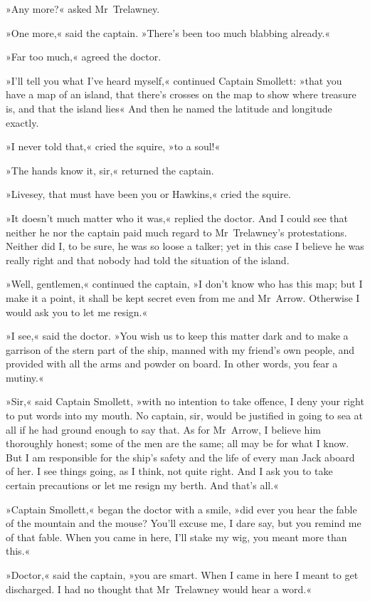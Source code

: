 »Any more?« asked Mr~Trelawney.

»One more,« said the captain. »There's been too much blabbing already.«

»Far too much,« agreed the doctor.

»I'll tell you what I've heard myself,« continued Captain Smollett: »that you have a map of an island, that there's crosses on the map to show where treasure is, and that the island lies\longdash« And then he named the latitude and longitude exactly.

»I never told that,« cried the squire, »to a soul!«

»The hands know it, sir,« returned the captain.

»Livesey, that must have been you or Hawkins,« cried the squire.

»It doesn't much matter who it was,« replied the doctor. And I could see that neither he nor the captain paid much regard to Mr~Trelawney's protestations. Neither did I, to be sure, he was so loose a talker; yet in this case I believe he was really right and that nobody had told the situation of the island.

»Well, gentlemen,« continued the captain, »I don't know who has this map; but I make it a point, it shall be kept secret even from me and Mr~Arrow. Otherwise I would ask you to let me resign.«

»I see,« said the doctor. »You wish us to keep this matter dark and to make a garrison of the stern part of the ship, manned with my friend's own people, and provided with all the arms and powder on board. In other words, you fear a mutiny.«

»Sir,« said Captain Smollett, »with no intention to take offence, I deny your right to put words into my mouth. No captain, sir, would be justified in going to sea at all if he had ground enough to say that. As for Mr~Arrow, I believe him thoroughly honest; some of the men are the same; all may be for what I know. But I am responsible for the ship's safety and the life of every man Jack aboard of her. I see things going, as I think, not quite right. And I ask you to take certain precautions or let me resign my berth. And that's all.«

»Captain Smollett,« began the doctor with a smile, »did ever you hear the fable of the mountain and the mouse? You'll excuse me, I dare say, but you remind me of that fable. When you came in here, I'll stake my wig, you meant more than this.«

»Doctor,« said the captain, »you are smart. When I came in here I meant to get discharged. I had no thought that Mr~Trelawney would hear a word.«

